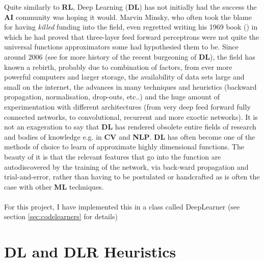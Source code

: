 Quite similarly to \textbf{RL}, Deep Learning (\textbf{DL}) has not initially had the success the \textbf{AI} community was hoping it would. Marvin Minsky, who often took the blame for having \textit{killed} funding into the field, even regretted writing his 1969 book (\cite{minskypapert69}) in which he had proved that three-layer feed forward perceptrons were not quite the universal functions approximators some had hypothesied them to be. Since around 2006 (see \cite{GoodBengCour16}for more history of the recent burgeoning of \textbf{DL}), the field has known a rebirth, probably due to combination of factors, from ever more powerful computers and larger storage, the availability of data sets large and small on the internet, the advances in many techniques and heuristics (backward propagation, normalisation, drop-outs, etc..) and the huge amount of experimentation with different architectures (from very deep feed forward fully connected networks, to convolutional, recurrent and more exoctic networks). It is not an exageration to say that \textbf{DL} has rendered obsolete entire fields of research and bodies of knowledge e.g. in \textbf{CV} and \textbf{NLP}. \textbf{DL} has often become one of the methods of choice to learn of approximate highly dimensional functions. The beauty of it is that the relevant features that go into the function are autodiscovered by the training of the network, via back-ward propagation and trial-and-error, rather than having to be postulated or handcrafted as is often the case with other \textbf{ML} techniques.
\\
\\
For this project, I have implemented this in a class called DeepLearner (see section \ref{sec:codelearners} for details)


\section{DL and DLR Heuristics}

